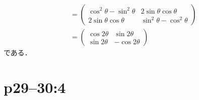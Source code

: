 \documentclass[a4paper,10pt,fleqn]{ltjsarticle}
\begin{document}
\begin{tleftbar}
\begin{align*}
                                   & = \begin{pmatrix} \cos ^2 \theta - \sin ^2 \theta & 2\sin \theta \cos \theta \\ 2\sin \theta \cos \theta & \sin ^2 \theta -\cos ^2 \theta \end{pmatrix} \\
                                   & = \begin{pmatrix} \cos 2 \theta & \sin 2 \theta \\ \sin 2\theta & -\cos 2 \theta \end{pmatrix}
    \end{align*}
    である．
\end{tleftbar}


\section*{p29--30:4}
\end{document}
